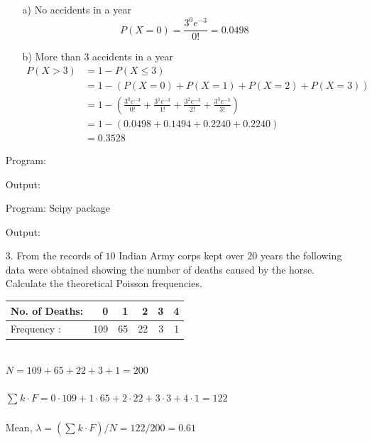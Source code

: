 \documentclass[a4paper,10pt,openright]{report}
\begin{document}
\begin{enumerate}
\begin{enumerate}
\item[a)] No accidents in a year 
\begin{equation*}
P(X = 0) = \frac{3^{0} e^{-3}}{0!} = 0.0498
\end{equation*}

\item[b)] More than $3$ accidents in a year 
\begin{equation*}
\begin{split}
		P(X > 3) & = 1 - P(X \leq 3) \\ 
		& = 1 - (P(X = 0) + P(X = 1) + P(X = 2) + P(X = 3)) \\
		& = 1 - \left( \frac{3^{0} e^{-3}}{0!} + \frac{3^{1} e^{-3}}{1!} + \frac{3^{2} e^{-3}}{2!} + \frac{3^{3} e^{-3}}{3!} \right) \\
		& = 1 - (0.0498 + 0.1494 + 0.2240 + 0.2240) \\
		& = 0.3528
\end{split}
\end{equation*}

\end{enumerate}

\pagebreak

Program:


Output:


\pagebreak

Program: Scipy package


Output:


\item[3.] From the records of $10$ Indian Army corps kept over $20$ years the following data
were obtained showing the number of deaths caused by the horse. Calculate the theoretical
Poisson frequencies. \\
\begin{tabular}{|l|r|r|r|r|r|}
\hline
No. of Deaths: & 0 & 1 & 2 & 3 & 4 \\
\hline
Frequency : & 109 & 65 & 22 & 3 & 1 \\
\hline
\end{tabular} \\

$N = 109 + 65 + 22 + 3 + 1 = 200$ \\ \\
$\sum_{}^{} k \cdot F = 0 \cdot 109 + 1 \cdot 65 + 2 \cdot 22 + 3 \cdot 3 + 4 \cdot 1 = 122$ \\ \\
Mean, $\lambda = (\sum_{}^{} k \cdot F)/N = 122/200 = 0.61$ \\


\end{enumerate}
\end{document}
